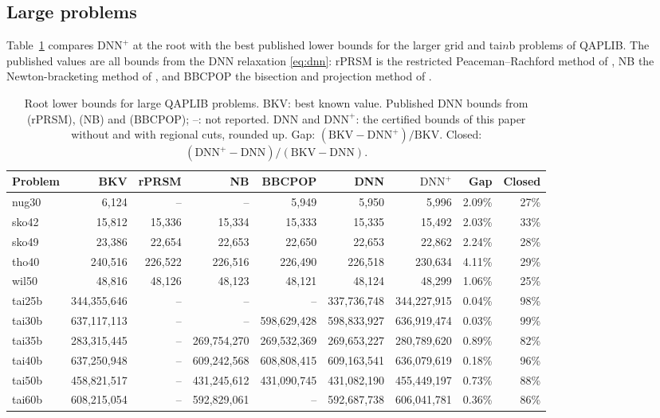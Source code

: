\documentclass[11pt]{article}
\theoremstyle{remark}
\newcommand{\DNN}{\mathrm{DNN}}
\newcommand{\DNNp}{\mathrm{DNN}^{+}}
\begin{document}
\subsection{Large problems}

Table~\ref{tab:large} compares $\DNNp$ at the root with the best published lower
bounds for the larger grid and tai$n$b problems of QAPLIB. The published values
are all bounds from the DNN relaxation \eqref{eq:dnn}: rPRSM is the restricted
Peaceman--Rachford method of \cite{graham}, NB the Newton-bracketing method of
\cite{kkt}, and BBCPOP the bisection and projection method of \cite{bbcpop}.

\begin{table}[t]\centering
\caption{Root lower bounds for large QAPLIB problems. BKV: best known value.
Published DNN bounds from \cite{graham} (rPRSM), \cite{kkt} (NB) and \cite{bbcpop}
(BBCPOP); --: not reported. DNN and $\DNNp$: the certified bounds of this paper
without and with regional cuts, rounded up. Gap: $(\mathrm{BKV}-\DNNp)/\mathrm{BKV}$.
Closed: $(\DNNp-\DNN)/(\mathrm{BKV}-\DNN)$.}\label{tab:large}
\small\setlength{\tabcolsep}{3.5pt}
\begin{tabular}{lrrrrrrrr}
\toprule
Problem & BKV & rPRSM & NB & BBCPOP & DNN & $\DNNp$ & Gap & Closed\\
\midrule
nug30 & 6,124 & -- & -- & 5,949 & 5,950 & 5,996 & 2.09\% & 27\%\\
sko42 & 15,812 & 15,336 & 15,334 & 15,333 & 15,335 & 15,492 & 2.03\% & 33\%\\
sko49 & 23,386 & 22,654 & 22,653 & 22,650 & 22,653 & 22,862 & 2.24\% & 28\%\\
tho40 & 240,516 & 226,522 & 226,516 & 226,490 & 226,518 & 230,634 & 4.11\% & 29\%\\
wil50 & 48,816 & 48,126 & 48,123 & 48,121 & 48,124 & 48,299 & 1.06\% & 25\%\\
\midrule
tai25b & 344,355,646 & -- & -- & -- & 337,736,748 & 344,227,915 & 0.04\% & 98\%\\
tai30b & 637,117,113 & -- & -- & 598,629,428 & 598,833,927 & 636,919,474 & 0.03\% & 99\%\\
tai35b & 283,315,445 & -- & 269,754,270 & 269,532,369 & 269,653,227 & 280,789,620 & 0.89\% & 82\%\\
tai40b & 637,250,948 & -- & 609,242,568 & 608,808,415 & 609,163,541 & 636,079,619 & 0.18\% & 96\%\\
tai50b & 458,821,517 & -- & 431,245,612 & 431,090,745 & 431,082,190 & 455,449,197 & 0.73\% & 88\%\\
tai60b & 608,215,054 & -- & 592,829,061 & -- & 592,687,738 & 606,041,781 & 0.36\% & 86\%\\
\bottomrule
\end{tabular}
\end{table}
\end{document}
